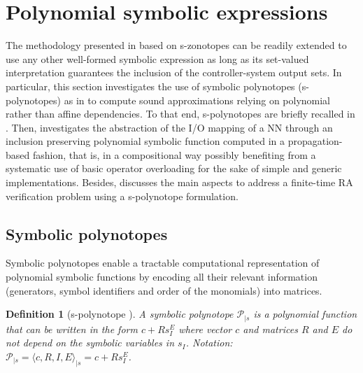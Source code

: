 \documentclass[journal]{IEEEtran}
\newtheorem{mydefinition}{Definition}
\begin{document}

\section{Polynomial symbolic expressions} \label{sec:polynotope}

The methodology presented in  based on s-zonotopes can  be readily extended to use any other well-formed symbolic expression as long as its set-valued interpretation guarantees the inclusion of the controller-system output sets. In particular, this section investigates the use of symbolic polynotopes (s-polynotopes) as in \cite{combastel2020functional} to compute sound approximations relying on polynomial rather than affine dependencies. To that end, s-polynotopes are briefly recalled in . Then,  investigates the abstraction of the I/O mapping of a NN through an inclusion preserving polynomial symbolic function computed in a propagation-based fashion, that is, in a compositional way possibly benefiting from a systematic use of basic operator overloading for the sake of simple and generic implementations. Besides,  discusses the main aspects to address a finite-time RA verification problem using a s-polynotope formulation.


\subsection{Symbolic polynotopes} \label{sec:s-polynotopes}

Symbolic polynotopes enable a  tractable computational representation of polynomial symbolic functions by encoding all their relevant information (generators, symbol identifiers and order of the monomials) into matrices.

\begin{mydefinition}[s-polynotope \cite{combastel2020functional}]\label{def:polynotope}
A symbolic polynotope $\mathcal{P}_{|s}$ is a polynomial function that can be written in the form $c+Rs_I^E$ where vector $c$ and matrices $R$ and $E$ do not depend on the symbolic variables in $s_I$. Notation: $\mathcal{P}_{|s} = \langle c,R,I,E\rangle_{|s} = c+Rs_I^E$.
\end{mydefinition}
\end{document}
